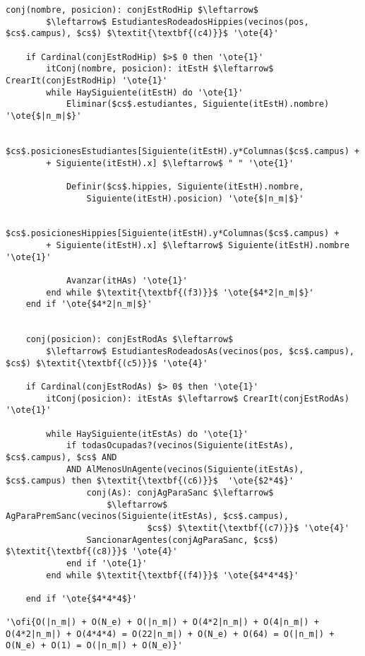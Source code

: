 \begin{lstlisting}[mathescape]
	conj(nombre, posicion): conjEstRodHip $\leftarrow$
		$\leftarrow$ EstudiantesRodeadosHippies(vecinos(pos, $cs$.campus), $cs$) $\textit{\textbf{(c4)}}$ '\ote{4}'

	if Cardinal(conjEstRodHip) $>$ 0 then '\ote{1}'
		itConj(nombre, posicion): itEstH $\leftarrow$ CrearIt(conjEstRodHip) '\ote{1}'
		while HaySiguiente(itEstH) do '\ote{1}'
			Eliminar($cs$.estudiantes, Siguiente(itEstH).nombre) '\ote{$|n_m|$}'

			$cs$.posicionesEstudiantes[Siguiente(itEstH).y*Columnas($cs$.campus) +
		+ Siguiente(itEstH).x] $\leftarrow$ " " '\ote{1}'

			Definir($cs$.hippies, Siguiente(itEstH).nombre,
				Siguiente(itEstH).posicion) '\ote{$|n_m|$}'

			$cs$.posicionesHippies[Siguiente(itEstH).y*Columnas($cs$.campus) +
		+ Siguiente(itEstH).x] $\leftarrow$ Siguiente(itEstH).nombre '\ote{1}'

			Avanzar(itHAs) '\ote{1}'
		end while $\textit{\textbf{(f3)}}$ '\ote{$4*2|n_m|$}'
	end if '\ote{$4*2|n_m|$}'


	conj(posicion): conjEstRodAs $\leftarrow$
		$\leftarrow$ EstudiantesRodeadosAs(vecinos(pos, $cs$.campus), $cs$) $\textit{\textbf{(c5)}}$ '\ote{4}'

	if Cardinal(conjEstRodAs) $> 0$ then '\ote{1}'
		itConj(posicion): itEstAs $\leftarrow$ CrearIt(conjEstRodAs) '\ote{1}'

		while HaySiguiente(itEstAs) do '\ote{1}'
			if todasOcupadas?(vecinos(Siguiente(itEstAs), $cs$.campus), $cs$ AND
			AND AlMenosUnAgente(vecinos(Siguiente(itEstAs), $cs$.campus) then $\textit{\textbf{(c6)}}$  '\ote{$2*4$}'
				conj(As): conjAgParaSanc $\leftarrow$
					$\leftarrow$ AgParaPremSanc(vecinos(Siguiente(itEstAs), $cs$.campus),
							$cs$) $\textit{\textbf{(c7)}}$ '\ote{4}'
				SancionarAgentes(conjAgParaSanc, $cs$) $\textit{\textbf{(c8)}}$ '\ote{4}'
			end if '\ote{1}'
		end while $\textit{\textbf{(f4)}}$ '\ote{$4*4*4$}'

	end if '\ote{$4*4*4$}'

'\ofi{O(|n_m|) + O(N_e) + O(|n_m|) + O(4*2|n_m|) + O(4|n_m|) + O(4*2|n_m|) + O(4*4*4) = O(22|n_m|) + O(N_e) + O(64) = O(|n_m|) + O(N_e) + O(1) = O(|n_m|) + O(N_e)}'
\end{lstlisting}


